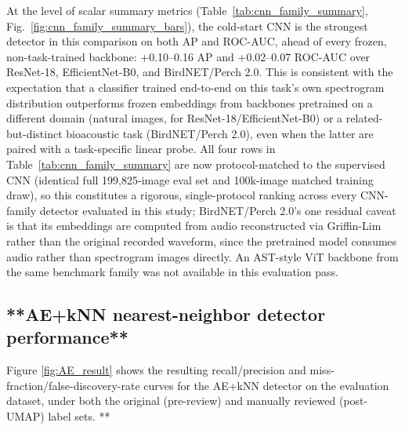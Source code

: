 \documentclass[preprint,NumberedRefs]{JASAnew}
\begin{document}

At the level of scalar summary metrics (Table~\ref{tab:cnn_family_summary},
Fig.~\ref{fig:cnn_family_summary_bars}), the cold-start CNN is the strongest
detector in this comparison on both AP and ROC-AUC, ahead of every frozen,
non-task-trained backbone: +0.10--0.16 AP and +0.02--0.07 ROC-AUC over
ResNet-18, EfficientNet-B0, and BirdNET/Perch 2.0. This is consistent with
the expectation that a classifier trained end-to-end on this task's own
spectrogram distribution outperforms frozen embeddings from backbones
pretrained on a different domain (natural images, for
ResNet-18/EfficientNet-B0) or a related-but-distinct bioacoustic task
(BirdNET/Perch 2.0), even when the latter are paired with a task-specific
linear probe. All four rows in Table~\ref{tab:cnn_family_summary} are now
protocol-matched to the supervised CNN (identical full 199,825-image eval
set and 100k-image matched training draw), so this constitutes a rigorous,
single-protocol ranking across every CNN-family detector evaluated in this
study; BirdNET/Perch 2.0's one residual caveat is that its embeddings are
computed from audio reconstructed via Griffin-Lim rather than the original
recorded waveform, since the pretrained model consumes audio rather than
spectrogram images directly. An AST-style ViT backbone from the same
benchmark family was not available in this evaluation pass.

\subsection{**AE+kNN nearest-neighbor detector performance**}
\label{sec:AEkNN}

Figure \ref{fig:AE_result} shows the resulting recall/precision and miss-fraction/false-discovery-rate curves for the AE+kNN detector on the evaluation dataset, under both the original (pre-review) and manually reviewed (post-UMAP) label sets.  **

\end{document}
